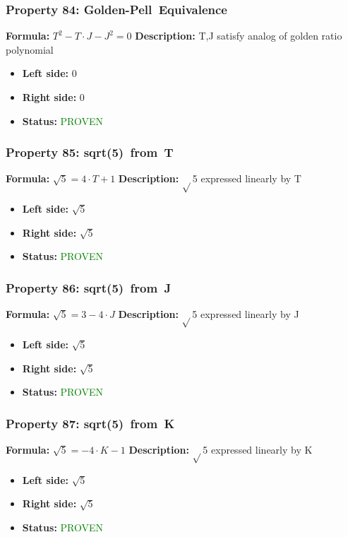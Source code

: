 \subsubsection*{Property 84: Golden-Pell~Equivalence}
\textbf{Formula:} $T^2 - T \cdot J - J^2 = 0$
\textbf{Description:} T,J satisfy analog of golden ratio polynomial

\begin{itemize}
\item \textbf{Left side:} $0$
\item \textbf{Right side:} $0$
\item \textbf{Status:} \textcolor{green}{PROVEN}
\end{itemize}

\subsubsection*{Property 85: sqrt(5)~from~T}
\textbf{Formula:} $\sqrt{5} = 4 \cdot T + 1$
\textbf{Description:} $\sqrt{}$5 expressed linearly by T

\begin{itemize}
\item \textbf{Left side:} $\sqrt{5}$
\item \textbf{Right side:} $\sqrt{5}$
\item \textbf{Status:} \textcolor{green}{PROVEN}
\end{itemize}

\subsubsection*{Property 86: sqrt(5)~from~J}
\textbf{Formula:} $\sqrt{5} = 3 - 4 \cdot J$
\textbf{Description:} $\sqrt{}$5 expressed linearly by J

\begin{itemize}
\item \textbf{Left side:} $\sqrt{5}$
\item \textbf{Right side:} $\sqrt{5}$
\item \textbf{Status:} \textcolor{green}{PROVEN}
\end{itemize}

\subsubsection*{Property 87: sqrt(5)~from~K}
\textbf{Formula:} $\sqrt{5} = -4 \cdot K - 1$
\textbf{Description:} $\sqrt{}$5 expressed linearly by K

\begin{itemize}
\item \textbf{Left side:} $\sqrt{5}$
\item \textbf{Right side:} $\sqrt{5}$
\item \textbf{Status:} \textcolor{green}{PROVEN}
\end{itemize}


